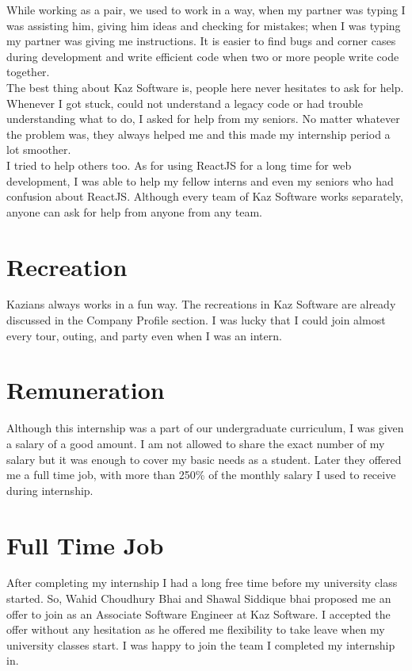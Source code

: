 While working as a pair, we used to work in a way, when my partner was typing I was assisting him, giving him ideas and checking for mistakes; when I was typing my partner was giving me instructions.
It is easier to find bugs and corner cases during development and write efficient code when two or more people write code together.\\

The best thing about Kaz Software is, people here never hesitates to ask for help.
Whenever I got stuck, could not understand a legacy code or had trouble understanding what to do, I asked for help from my seniors.
No matter whatever the problem was, they always helped me and this made my internship period a lot smoother.\\

I tried to help others too.
As for using ReactJS for a long time for web development, I was able to help my fellow interns and even my seniors who had confusion about ReactJS.
Although every team of Kaz Software works separately, anyone can ask for help from anyone from any team.

\section{Recreation} 

Kazians always works in a fun way.
The recreations in Kaz Software are already discussed in the Company Profile section.
I was lucky that I could join almost every tour, outing, and party even when I was an intern.

\section{Remuneration}

Although this internship was a part of our undergraduate curriculum, I was given a salary of a good amount.
I am not allowed to share the exact number of my salary but it was enough to cover my basic needs as a student.
Later they offered me a full time job, with more than 250\% of the monthly salary I used to receive during internship.

\section{Full Time Job}

After completing my internship I had a long free time before my university class started.
So, Wahid Choudhury Bhai and Shawal Siddique bhai proposed me an offer to join as an Associate Software Engineer at Kaz Software.
I accepted the offer without any hesitation as he offered me flexibility to take leave when my university classes start.
I was happy to join the team I completed my internship in.
